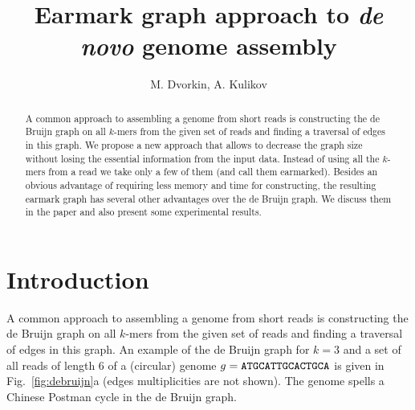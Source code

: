 \documentclass[12pt]{article}
\begin{document}

\author{M. Dvorkin, A. Kulikov}
\title{Earmark graph approach to {\it de novo} genome assembly}
\maketitle

\begin{abstract}
A common approach to assembling a genome from short reads is constructing
the de Bruijn graph on all $k$-mers from the given set of reads and finding a traversal of edges
in this graph. We propose a new approach that allows to decrease
the graph size without losing the essential information from the input data.
Instead of using all the $k$-mers from a read we take only a few of them
(and call them earmarked). Besides an obvious advantage of requiring less memory 
and time for constructing, the resulting earmark graph has several other advantages over the
de Bruijn graph. We discuss them in the paper and also present some experimental results.
\end{abstract}

\tableofcontents


\section{Introduction}
A common approach to assembling a genome from short reads is constructing
the de Bruijn graph \cite{PW01} on all $k$-mers from the given set of 
reads and finding a traversal of edges in this graph.
An example of the de Bruijn graph for $k=3$ and a set of all reads of length $6$
of a (circular) genome $g={\tt ATGCATTGCACTGCA}$ is given in Fig.~\ref{fig:debruijn}a
(edges multiplicities are not shown). The genome spells a Chinese Postman
cycle in the de Bruijn graph.
\end{document}
